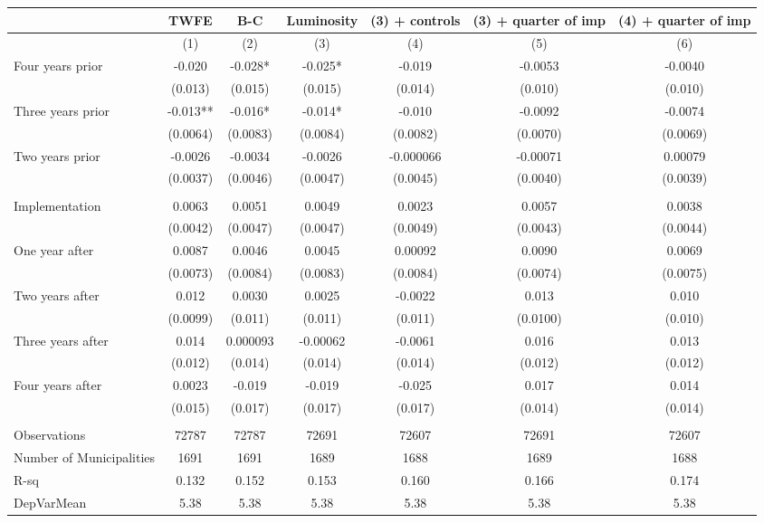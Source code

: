 \begin{tabular}{lcccccc}
\toprule
      & TWFE  & B-C   & Luminosity & (3) + controls & (3) + quarter of imp & (4) + quarter of imp \\
\midrule
      & (1)   & (2)   & (3)   & (4)   & (5)   & (6) \\
\midrule
\midrule
Four years prior & -0.020 & -0.028* & -0.025* & -0.019 & -0.0053 & -0.0040 \\
      & (0.013) & (0.015) & (0.015) & (0.014) & (0.010) & (0.010) \\
Three years prior & -0.013** & -0.016* & -0.014* & -0.010 & -0.0092 & -0.0074 \\
      & (0.0064) & (0.0083) & (0.0084) & (0.0082) & (0.0070) & (0.0069) \\
Two years prior & -0.0026 & -0.0034 & -0.0026 & -0.000066 & -0.00071 & 0.00079 \\
      & (0.0037) & (0.0046) & (0.0047) & (0.0045) & (0.0040) & (0.0039) \\
      &       &       &       &       &       &  \\
Implementation & 0.0063 & 0.0051 & 0.0049 & 0.0023 & 0.0057 & 0.0038 \\
      & (0.0042) & (0.0047) & (0.0047) & (0.0049) & (0.0043) & (0.0044) \\
One year after & 0.0087 & 0.0046 & 0.0045 & 0.00092 & 0.0090 & 0.0069 \\
      & (0.0073) & (0.0084) & (0.0083) & (0.0084) & (0.0074) & (0.0075) \\
Two years after & 0.012 & 0.0030 & 0.0025 & -0.0022 & 0.013 & 0.010 \\
      & (0.0099) & (0.011) & (0.011) & (0.011) & (0.0100) & (0.010) \\
Three years after & 0.014 & 0.000093 & -0.00062 & -0.0061 & 0.016 & 0.013 \\
      & (0.012) & (0.014) & (0.014) & (0.014) & (0.012) & (0.012) \\
Four years after & 0.0023 & -0.019 & -0.019 & -0.025 & 0.017 & 0.014 \\
      & (0.015) & (0.017) & (0.017) & (0.017) & (0.014) & (0.014) \\
      &       &       &       &       &       &  \\
\midrule
Observations & 72787 & 72787 & 72691 & 72607 & 72691 & 72607 \\
Number of Municipalities & 1691  & 1691  & 1689  & 1688  & 1689  & 1688 \\
R-sq  & 0.132 & 0.152 & 0.153 & 0.160 & 0.166 & 0.174 \\
DepVarMean & 5.38  & 5.38  & 5.38  & 5.38  & 5.38  & 5.38 \\
\bottomrule
\bottomrule
\end{tabular}%
